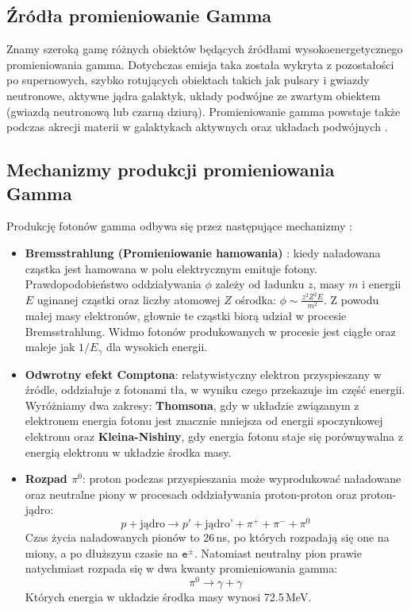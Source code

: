 \documentclass[a4paper,11pt,twoside]{article}
\begin{document}
\subsection{Źródła promieniowanie Gamma}
Znamy szeroką gamę różnych obiektów będących źródłami wysokoenergetycznego promieniowania gamma. Dotychczas emisja taka została wykryta z pozostałości po supernowych, szybko rotujących obiektach takich jak pulsary i gwiazdy neutronowe, aktywne jądra galaktyk, układy podwójne ze zwartym obiektem (gwiazdą neutronową lub czarną dziurą). Promieniowanie gamma powstaje także podczas akrecji materii w galaktykach aktywnych oraz układach podwójnych \cite{astro_particle}. 
\subsection{Mechanizmy produkcji promieniowania Gamma}
Produkcję fotonów gamma odbywa się przez następujące mechanizmy \cite{astro_particle}:
\begin{itemize}
\item {\bf{Bremsstrahlung} (Promieniowanie hamowania) }:
kiedy naładowana cząstka jest hamowana w polu elektrycznym emituje fotony. Prawdopodobieństwo oddziaływania $\phi$ zależy od ładunku $z$, masy $m$ i energii $E$ uginanej cząstki oraz liczby atomowej $Z$ ośrodka: $\phi \sim \frac{z^2 Z^2 E}{m^2}$. Z powodu małej masy elektronów, głownie te cząstki biorą udział w procesie Bremsstrahlung. Widmo fotonów produkowanych w procesie jest ciągłe oraz maleje jak $1/E_{\gamma}$ dla wysokich energii.  
\item {\bf{Odwrotny efekt Comptona}}:
relatywistyczny elektron przyspieszany w źródle, oddziałuje z fotonami tła, w wyniku czego przekazuje im część energii. Wyróżniamy dwa zakresy: {\bf{Thomsona}}, gdy w układzie związanym z elektronem energia fotonu jest znacznie mniejsza od energii spoczynkowej elektronu oraz {\bf{Kleina-Nishiny}}, gdy energia fotonu staje się porównywalna z energią elektronu w układzie środka masy. 
\item {\bf{Rozpad $\pi^0$}}: proton podczas przyspieszania może wyprodukować naładowane oraz neutralne piony w procesach oddziaływania proton-proton oraz proton-jądro:
\begin{equation}
p + \text{jądro} \rightarrow p' + \text{jądro'} + \pi^+ + \pi^- + \pi^0
\end{equation} 
Czas życia naładowanych pionów to 26\,ns, po których rozpadają się one na miony, a po dłuższym czasie na $\mathtt{e^{\pm}}$. Natomiast neutralny pion prawie natychmiast rozpada się w dwa kwanty promieniowania gamma:
\begin{equation}
\pi^0 \rightarrow \gamma + \gamma
\end{equation}
Których energia w układzie środka masy wynosi 72.5\,MeV.
\end{itemize}
\end{document}
